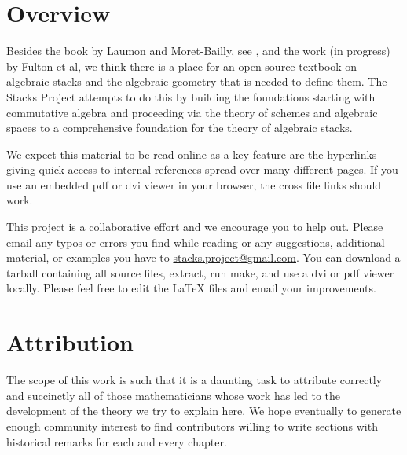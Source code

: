 \section{Overview}
\label{introduction-section-overview}
Besides the book by Laumon and Moret-Bailly, see \cite{LM-B}, and the work
(in progress) by Fulton et al, we think there is a place for an open source
textbook on algebraic stacks and the algebraic geometry that is needed
to define them. The Stacks Project attempts to do this by building the
foundations starting with commutative algebra and proceeding via the
theory of schemes and algebraic spaces to a comprehensive foundation for
the theory of algebraic stacks.

\medskip\noindent
We expect this material to be read online as a key feature are the hyperlinks
giving quick access to internal references spread over many different pages.
If you use an embedded pdf or dvi viewer in your browser, the cross file
links should work.

\medskip\noindent
This project is a collaborative effort and we encourage you to help out.
Please email any typos or errors you find while reading or
any suggestions, additional material, or examples you have to
\href{mailto:stacks.project@gmail.com}{stacks.project@gmail.com}.
You can download a tarball containing all source files, extract,
run make, and use a dvi or pdf viewer locally. Please feel free to
edit the LaTeX files and email your improvements.

\section{Attribution}
\label{introduction-section-attribution}
The scope of this work is such that it is a daunting task to attribute
correctly and succinctly all of those mathematicians whose work has led
to the development of the theory we try to explain here. We hope eventually
to generate enough community interest to find contributors willing to write
sections with historical remarks for each and every chapter.

